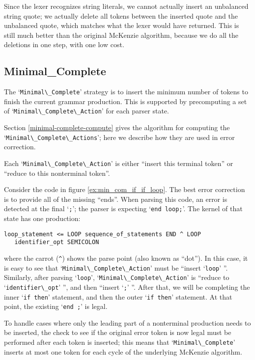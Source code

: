 \documentclass{article}
\newcommand{\code}[1]{`\lstinline|#1|'}
\begin{document}
Since the lexer recognizes string literals, we cannot actually insert
an unbalanced string quote; we actually delete all tokens between the
inserted quote and the unbalanced quote, which matches what the lexer
would have returned. This is still much better than the original
McKenzie algorithm, because we do all the deletions in one step, with
one low cost.

\subsection{Minimal\_Complete}
The \code{Minimal\_Complete} strategy is to insert the minimum number
of tokens to finish the current grammar production. This is supported
by precomputing a set of \code{Minimal\_Complete\_Action} for each
parser state.

Section \ref{minimal-complete-compute} gives the algorithm for
computing the\\ \code{Minimal\_Complete\_Actions}; here we describe how
they are used in error correction.

Each \code{Minimal\_Complete\_Action} is either ``insert this terminal
token'' or ``reduce to this nonterminal token''.

Consider the code in figure \ref{ex:min_com_if_if_loop}. The best
error correction is to provide all of the missing ``ends''. When
parsing this code, an error is detected at the final \code{;}; the
parser is expecting \code{end loop;}. The kernel of that state has one
production:
\begin{verbatim}
loop_statement <= LOOP sequence_of_statements END ^ LOOP
   identifier_opt SEMICOLON
\end{verbatim}
where the carrot (\verb|^|) shows the parse point (also known as
``dot''). In this case, it is easy to see that
\code{Minimal\_Complete\_Action} must be ``insert \code{loop} ''.
Similarly, after parsing \code{loop}, \code{Minimal\_Complete\_Action}
is ``reduce to \code{identifier\_opt} '', and then ``insert \code{;}
''. After that, we will be completing the inner \code{if then}
statement, and then the outer \code{if then} statement. At that point,
the existing \code{end ;} is legal.

To handle cases where only the leading part of a nonterminal
production needs to be inserted, the check to see if the original
error token is now legal must be performed after each token is
inserted; this means that \code{Minimal\_Complete} inserts at most one
token for each cycle of the underlying McKenzie algorithm.
\end{document}
